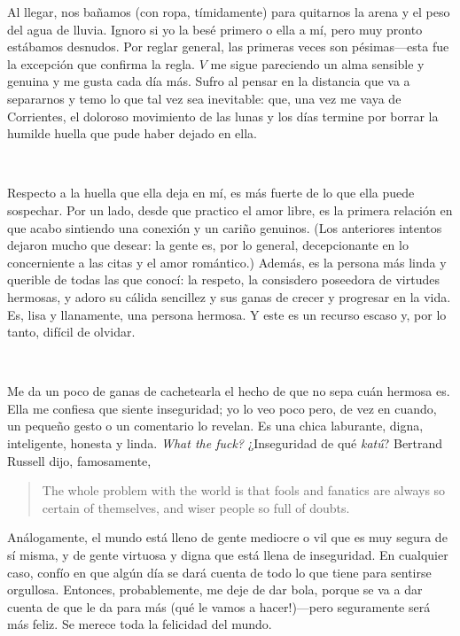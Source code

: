 \documentclass[a4paper, 12pt]{article}
\begin{document}
Al llegar, nos bañamos (con ropa, tímidamente) para quitarnos la arena y el
peso del agua de lluvia. Ignoro si yo la besé primero o ella a mí, pero muy
pronto estábamos desnudos. Por reglar general, las primeras veces son
pésimas---esta fue la excepción que confirma la regla. $V$ me sigue pareciendo
un alma sensible y genuina y me gusta cada día más. Sufro al pensar en la
distancia que va a separarnos y temo lo que tal vez sea inevitable: que, una
vez me vaya de Corrientes, el doloroso movimiento de las lunas y los días
termine por borrar la humilde huella que pude haber dejado en ella.

~ 

Respecto a la huella que ella deja en mí, es más fuerte de lo que ella puede
sospechar. Por un lado, desde que practico el amor libre, es la primera
relación en que acabo sintiendo una conexión y un cariño genuinos. (Los
anteriores intentos dejaron mucho que desear: la gente es, por lo general,
decepcionante en lo concerniente a las citas y el amor romántico.) Además, es
la persona más linda y querible de todas las que conocí: la respeto, la
consisdero poseedora de virtudes hermosas, y adoro su cálida sencillez y sus
ganas de crecer y progresar en la vida. Es, lisa y llanamente, una persona 
hermosa. Y este es un recurso escaso y, por lo tanto, difícil de olvidar.

~ 

Me da un poco de ganas de cachetearla el hecho de que no sepa cuán hermosa es.
Ella me confiesa que siente inseguridad; yo lo veo poco pero, de vez en cuando,
un pequeño gesto o un comentario lo revelan. Es una chica laburante, digna, 
inteligente, honesta y linda. \textit{What the fuck?} ¿Inseguridad de qué \textit{katú}?
Bertrand Russell dijo, famosamente,

\begin{quote}
    The whole problem with the world is that fools and fanatics are always so certain of themselves, and wiser people so full of doubts.
\end{quote}

Análogamente, el mundo está lleno de gente mediocre o vil que es muy segura de
sí misma, y de gente virtuosa y digna que está llena de inseguridad. En
cualquier caso, confío en que algún día se dará cuenta de todo lo que tiene
para sentirse orgullosa. Entonces, probablemente, me deje de dar bola, porque
se va a dar cuenta de que le da para más (qué le vamos a hacer!)---pero
seguramente será más feliz. Se merece toda la felicidad del mundo.
\end{document}
